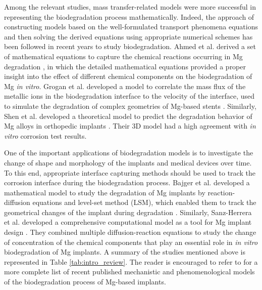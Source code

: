 Among the relevant studies, mass transfer-related models were more successful in representing the biodegradation process mathematically. Indeed, the approach of constructing models based on the well-formulated transport phenomena equations and then solving the derived equations using appropriate numerical schemes has been followed in recent years to study biodegradation. Ahmed et al. derived a set of mathematical equations to capture the chemical reactions occurring in Mg degradation \cite{Ahmed2017}, in which the detailed mathematical equations provided a proper insight into the effect of different chemical components on the biodegradation of Mg \textit{in vitro}. Grogan et al. developed a model to correlate the mass flux of the metallic ions in the biodegradation interface to the velocity of the interface, used to simulate the degradation of complex geometries of Mg-based stents \cite{Grogan2014}. Similarly, Shen et al. developed a theoretical model to predict the degradation behavior of Mg alloys in orthopedic implants \cite{Shen2019}. Their 3D model had a high agreement with \textit{in vitro} corrosion test results.


One of the important applications of biodegradation models is to investigate the change of shape and morphology of the implants and medical devices over time. To this end, appropriate interface capturing methods should be used to track the corrosion interface during the biodegradation process. Bajger et al. developed a mathematical model to study the degradation of Mg implants by reaction-diffusion equations and level-set method (\gls{LSM}), which enabled them to track the geometrical changes of the implant during degradation \cite{Bajger2016}. Similarly, Sanz-Herrera et al. developed a comprehensive computational model as a tool for Mg implant design \cite{Sanz-Herrera2018}. They combined multiple diffusion-reaction equations to study the change of concentration of the chemical components that play an essential role in \textit{in vitro} biodegradation of Mg implants. A summary of the studies mentioned above is represented in Table \ref{tab:intro_review}. The reader is encouraged to refer to \cite{Albaraghtheh2022} for a more complete list of recent published mechanistic and phenomenological models of the biodegradation process of Mg-based implants.


